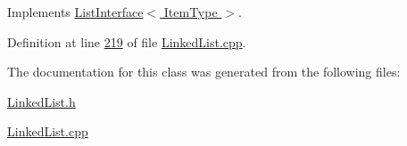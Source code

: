 Implements \hyperlink{classListInterface_aae877a56b7b9f5f526c37a00e234fad1}{List\+Interface$<$ Item\+Type $>$}.



Definition at line \hyperlink{LinkedList_8cpp_source_l00219}{219} of file \hyperlink{LinkedList_8cpp_source}{Linked\+List.\+cpp}.



The documentation for this class was generated from the following files\+:\begin{DoxyCompactItemize}
\item 
\hyperlink{LinkedList_8h}{Linked\+List.\+h}\item 
\hyperlink{LinkedList_8cpp}{Linked\+List.\+cpp}\end{DoxyCompactItemize}
